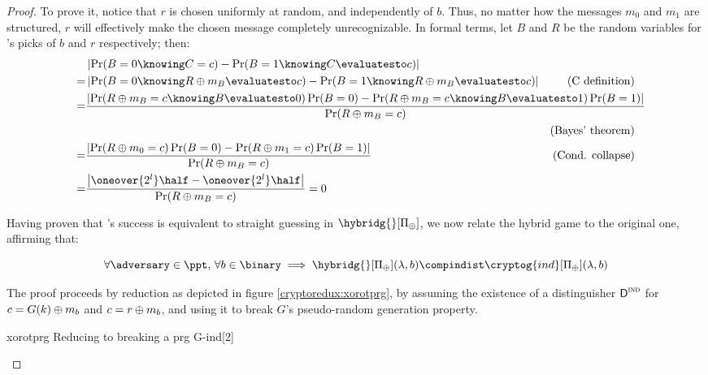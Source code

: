 \begin{proof}
    To prove it, notice that $r$ is chosen uniformly at random, and independently of $b$. Thus, no matter how the messages $m_0$ and $m_1$ are structured, $r$ will effectively make the chosen message completely unrecognizable. In formal terms, let $B$ and $R$ be the random variables for \challenger{}'s picks of $b$ and $r$ respectively; then:
    \begin{align*} %
        & \left| \Pr(B = 0 \knowing C = c) - \Pr(B = 1 \knowing C \evaluatesto c) \right| & \\
        =& \left| \Pr(B = 0 \knowing R \xor m_B \evaluatesto c) - \Pr(B = 1 \knowing R \xor m_B \evaluatesto c) \right| & \text{(C definition)} \\
        =& \mathrlap{\frac{\left| \Pr(R \xor m_B = c \knowing B \evaluatesto 0) \Pr(B = 0) - \Pr(R \xor m_B = c \knowing B \evaluatesto 1) \Pr(B = 1) \right|}{\Pr(R \xor m_B = c)}} & \\
        & & \text{(Bayes' theorem)} \\
        =& \frac{\left| \Pr(R \xor m_0 = c) \Pr(B = 0) - \Pr(R \xor m_1 = c) \Pr(B = 1) \right|}{\Pr(R \xor m_B = c)} & \text{(Cond. collapse)} \\
        =& \frac{\left| \oneover{2^l} \half - \oneover{2^l} \half \right|}{\Pr(R \xor m_B = c)} = 0 & \\
    \end{align*}

    Having proven that \adversary's success is equivalent to straight guessing in $\hybridg{}[\Pi_\xor]$, we now relate the hybrid game to the original one, affirming that:
    
    \begin{claim}
        \[
            \forall \adversary \in \ppt,\, \forall b \in \binary \implies \hybridg{}[\Pi_\xor](\lambda, b) \compindist \cryptog{ind}[\Pi_\xor](\lambda, b)
        \]
    \end{claim}

    The proof proceeds by reduction as depicted in figure \ref{cryptoredux:xorotprg}, by assuming the existence of a distinguisher $\textsf{D}^{\textsc{ind}}$ for $c = G(k) \oplus m_{b}$ and $c = r \oplus m_{b}$, and using it to break $G$'s pseudo-random generation property.

    \begin{cryptoredux}
        {xorotprg}
        {Reducing to breaking a \prg}
        {prg}
        {G-ind}[2]



\end{cryptoredux}
\end{proof}
